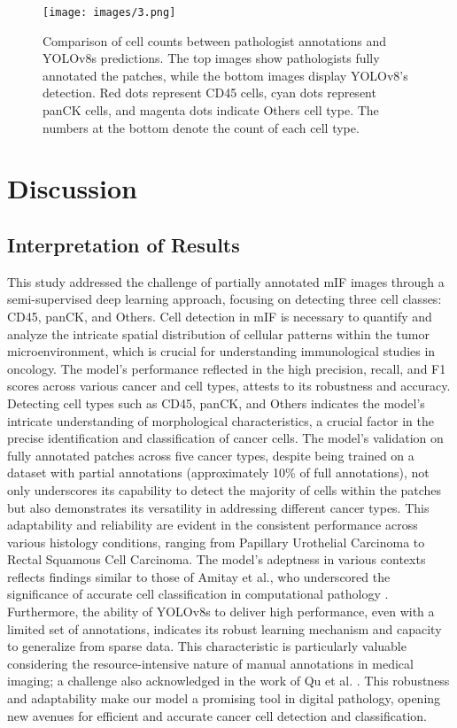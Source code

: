 \documentclass{midl} %
\begin{document}
\begin{figure}[!htbp]
\centering
\texttt{[image: images/3.png]}
\caption{Comparison of cell counts between pathologist annotations and YOLOv8s predictions. The top images show pathologists fully annotated the patches, while the bottom images display YOLOv8's detection. Red dots represent CD45 cells, cyan dots represent panCK cells, and magenta dots indicate Others cell type. The numbers at the bottom denote the count of each cell type.}
\label{fig:cc_comparison}
\end{figure}

\section{Discussion}
\subsection{Interpretation of Results}
This study addressed the challenge of partially annotated mIF images through a semi-supervised deep learning approach, focusing on detecting three cell classes: CD45, panCK, and Others. Cell detection in mIF is necessary to quantify and analyze the intricate spatial distribution of cellular patterns within the tumor microenvironment, which is crucial for understanding immunological studies in oncology. The model's performance reflected in the high precision, recall, and F1 scores across various cancer and cell types, attests to its robustness and accuracy. Detecting cell types such as CD45, panCK, and Others indicates the model's intricate understanding of morphological characteristics, a crucial factor in the precise identification and classification of cancer cells.
The model's validation on fully annotated patches across five cancer types, despite being trained on a dataset with partial annotations (approximately 10\% of full annotations), not only underscores its capability to detect the majority of cells within the patches but also demonstrates its versatility in addressing different cancer types. This adaptability and reliability are evident in the consistent performance across various histology conditions, ranging from Papillary Urothelial Carcinoma to Rectal Squamous Cell Carcinoma. The model's adeptness in various contexts reflects findings similar to those of Amitay et al., who underscored the significance of accurate cell classification in computational pathology \cite{amitay2023cellsighter}. Furthermore, the ability of YOLOv8s to deliver high performance, even with a limited set of annotations, indicates its robust learning mechanism and capacity to generalize from sparse data. This characteristic is particularly valuable considering the resource-intensive nature of manual annotations in medical imaging; a challenge also acknowledged in the work of Qu et al. \cite{qu2020weakly}. This robustness and adaptability make our model a promising tool in digital pathology, opening new avenues for efficient and accurate cancer cell detection and classification.
\end{document}
